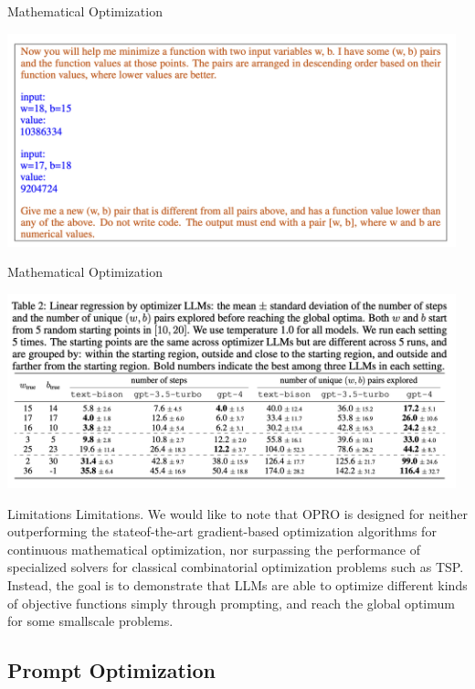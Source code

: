 \documentclass[aspectratio=1610,xcolor={dvipsnames},hyperref={colorlinks,unicode,linkcolor=violet,anchorcolor=BlueViolet,citecolor=YellowOrange,filecolor=black,urlcolor=Aquamarine}]{beamer}
\begin{document}
\begin{frame}[label={sec:org6894215}]{Mathematical Optimization}
\begin{center}
\includegraphics[width=13cm]{./p3.png}
\end{center}
\end{frame}
\begin{frame}[label={sec:orgd5d5869}]{Mathematical Optimization}
\begin{center}
\includegraphics[width=13cm]{./p4.png}
\end{center}
\end{frame}
\begin{frame}[label={sec:orgd30705c}]{Limitations}
Limitations. We would like to note that OPRO is designed for neither outperforming the stateof-the-art gradient-based optimization algorithms for continuous mathematical optimization, nor
surpassing the performance of specialized solvers for classical combinatorial optimization problems
such as TSP. Instead, the goal is to demonstrate that LLMs are able to optimize different kinds
of objective functions simply through prompting, and reach the global optimum for some smallscale problems.
\end{frame}
\subsection{Prompt Optimization}
\label{sec:org928cf3d}
\end{document}
